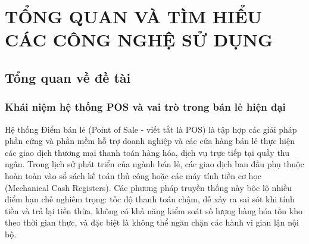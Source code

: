 \chapter{TỔNG QUAN VÀ TÌM HIỂU CÁC CÔNG NGHỆ SỬ DỤNG}
\label{chap:tong_quan_cong_nghe}

\section{Tổng quan về đề tài}
\label{sec:tong_quan_de_tai}

\subsection{Khái niệm hệ thống POS và vai trò trong bán lẻ hiện đại}
Hệ thống Điểm bán lẻ (Point of Sale - viết tắt là POS) là tập hợp các giải pháp phần cứng và phần mềm hỗ trợ doanh nghiệp và các cửa hàng bán lẻ thực hiện các giao dịch thương mại thanh toán hàng hóa, dịch vụ trực tiếp tại quầy thu ngân. Trong lịch sử phát triển của ngành bán lẻ, các giao dịch ban đầu phụ thuộc hoàn toàn vào sổ sách kế toán thủ công hoặc các máy tính tiền cơ học (Mechanical Cash Registers). Các phương pháp truyền thống này bộc lộ nhiều điểm hạn chế nghiêm trọng: tốc độ thanh toán chậm, dễ xảy ra sai sót khi tính tiền và trả lại tiền thừa, không có khả năng kiểm soát số lượng hàng hóa tồn kho theo thời gian thực, và đặc biệt là không thể ngăn chặn các hành vi gian lận nội bộ.


